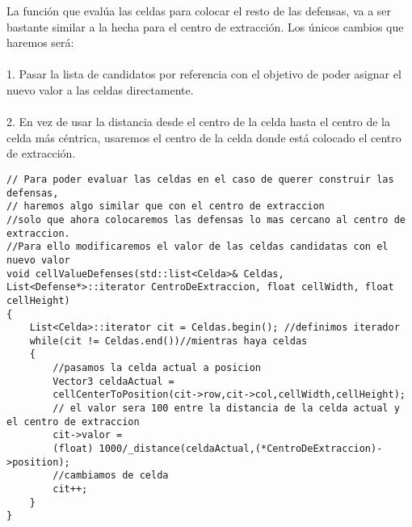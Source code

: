La función que evalúa las celdas para colocar el resto de las defensas, va a ser bastante similar a la hecha para el centro de extracción. Los únicos cambios que haremos será: \\\\
1. Pasar la lista de candidatos por referencia con el objetivo de poder asignar el nuevo valor a las celdas directamente.\\\\
2. En vez de usar la distancia desde el centro de la celda hasta el centro de la celda más céntrica, usaremos el centro de la celda donde está colocado el centro de extracción.


\begin{lstlisting}[frame=single,basicstyle=\tiny,title={Funcion cellValueDefenses}]
// Para poder evaluar las celdas en el caso de querer construir las defensas,
// haremos algo similar que con el centro de extraccion
//solo que ahora colocaremos las defensas lo mas cercano al centro de extraccion. 
//Para ello modificaremos el valor de las celdas candidatas con el nuevo valor
void cellValueDefenses(std::list<Celda>& Celdas,
List<Defense*>::iterator CentroDeExtraccion, float cellWidth, float cellHeight)
{													
	List<Celda>::iterator cit = Celdas.begin(); //definimos iterador
	while(cit != Celdas.end())//mientras haya celdas
	{
		//pasamos la celda actual a posicion
		Vector3 celdaActual = 
		cellCenterToPosition(cit->row,cit->col,cellWidth,cellHeight);
		// el valor sera 100 entre la distancia de la celda actual y el centro de extraccion
		cit->valor = 
		(float) 1000/_distance(celdaActual,(*CentroDeExtraccion)->position);	
		//cambiamos de celda
		cit++;
	}
}
\end{lstlisting}

